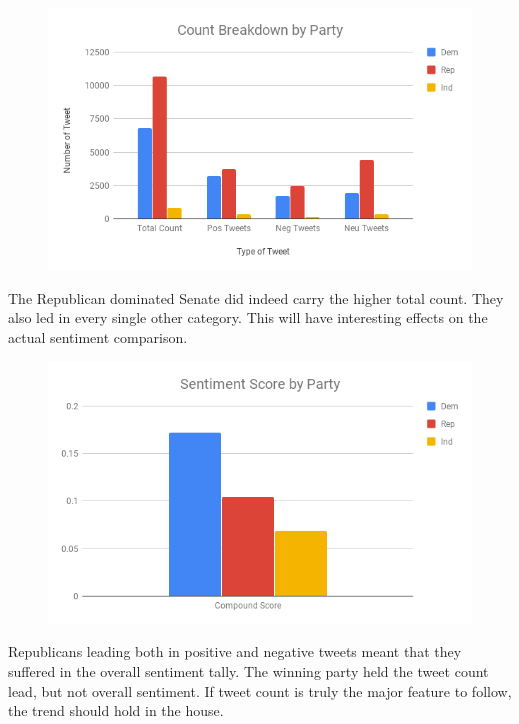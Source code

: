 \documentclass[11pt, twoside, reqno]{article}
\begin{document}
\begin{figure}[H]
\centering
	\includegraphics[scale=0.5]{count_party_senate}	
\end{figure}

The Republican dominated Senate did indeed carry the higher total count. They also led in every single other category. This will have interesting effects on the actual sentiment comparison.

\begin{figure}[H]
\centering
	\includegraphics[scale=0.5]{party_sent}
\end{figure}

Republicans leading both in positive and negative tweets meant that they suffered in the overall sentiment tally. The winning party held the tweet count lead, but not overall sentiment. If tweet count is truly the major feature to follow, the trend should hold in the house.
\end{document}
